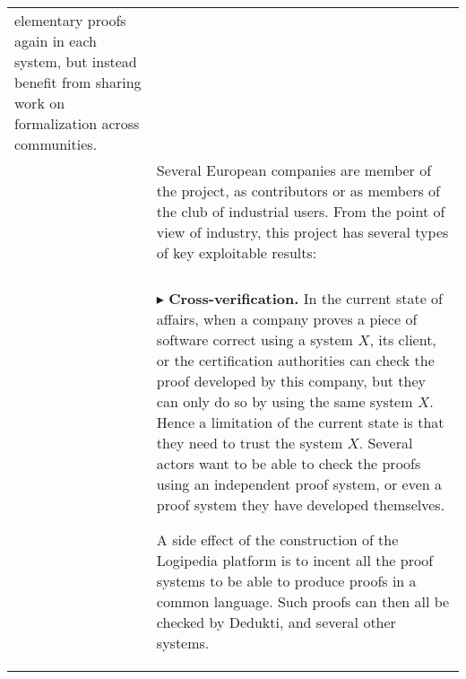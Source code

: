 \begin{longtable}{|p{}|p{}|}
elementary proofs again in each system, but instead benefit from
sharing work on formalization across communities.\\
&
\hspace{0.4cm}
Several European companies are member of the project,
as contributors or as members of the club of
industrial users.  From the point of view of industry, this
project has several types of key exploitable results:\\
&\\
&
$\blacktriangleright$
{\bf Cross-verification.}
In the current state of affairs, when a company proves a piece of
software correct using a system $X$, its client, or the certification
authorities can check the proof developed by this company, but they
can only do so by using the same system $X$. Hence a limitation of
the current state is that they need to trust the system $X$.
Several actors want to be able to check the proofs using an
independent proof system, or even a proof system they have developed
themselves.

A side effect of the construction of the Logipedia platform is
to incent all the proof systems to be able to produce proofs in a
common language. Such proofs can then all be checked by
Dedukti, and several other systems.


\end{longtable}
